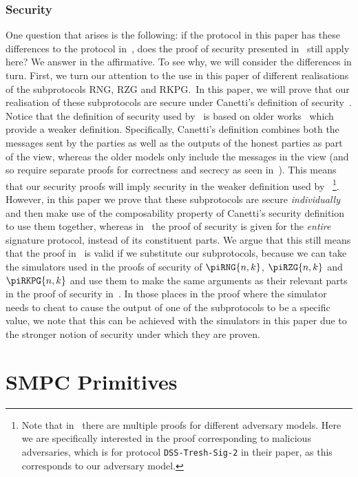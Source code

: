 \documentclass{article}
\newcommand\paper{paper}
\theoremstyle{remark}
\begin{document}
\subsubsection{Security}

One question that arises is the following: if the protocol in this \paper{} has
these differences to the protocol in~\cite{gjkr96}, does the proof of security
presented in~\cite{gjkr96} still apply here? We answer in the affirmative. To
see why, we will consider the differences in turn. First, we turn our attention
to the use in this \paper{} of different realisations of the subprotocols RNG,
RZG and RKPG.\ In this paper, we will prove that our realisation of these
subprotocols are secure under Canetti's definition of security~\cite{c00}.
Notice that the definition of security used by~\cite{gjkr96} is based on older
works~\cite{gmr89,mr92,b92} which provide a weaker definition. Specifically,
Canetti's definition combines both the messages sent by the parties as well as
the outputs of the honest parties as part of the view, whereas the older models
only include the messages in the view (and so require separate proofs for
correctness and secrecy as seen in~\cite{gjkr96}). This means that our security
proofs will imply security in the weaker definition used by~\cite{gjkr96}%
\footnote{%
	Note that in~\cite{gjkr96} there are multiple proofs for different
	adversary models. Here we are specifically interested in the proof
	corresponding to malicious adversaries, which is for protocol
	\texttt{DSS-Tresh-Sig-2} in their paper, as this corresponds to our
	adversary model.
}.
However, in this \paper{} we prove that these subprotocols are secure
\textit{individually} and then make use of the composability property of
Canetti's security definition to use them together, whereas in~\cite{gjkr96}
the proof of security is given for the \textit{entire} signature protocol,
instead of its constituent parts. We argue that this still means that the proof
in~\cite{gjkr96} is valid if we substitute our subprotocols, because we can
take the simulators used in the proofs of security of $\piRNG{n,k}$,
$\piRZG{n,k}$ and $\piRKPG{n,k}$ and use them to make the same arguments as
their relevant parts in the proof of security in~\cite{gjkr96}. In those places
in the proof where the simulator needs to cheat to cause the output of one of
the subprotocols to be a specific value, we note that this can be achieved with
the simulators in this paper due to the stronger notion of security under which
they are proven.

\section{SMPC Primitives}
\end{document}
